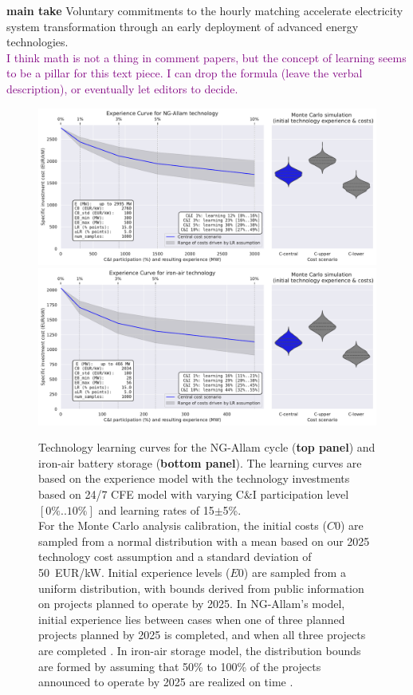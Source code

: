 \documentclass[pdflatex,sn-basic, Numbered]{sn-jnl}%
\theoremstyle{thmstyleone}%
\theoremstyle{thmstyletwo}%
\theoremstyle{thmstylethree}%
\newcommand{\comment}[1]{\textcolor{purple}{#1}}
\begin{document}
\noindent\textbf{main take} Voluntary commitments to the hourly matching accelerate electricity system transformation through an early deployment of advanced energy technologies. \\

\comment{I think math is not a thing in comment papers, but the concept of learning seems to be a pillar for this text piece. I can drop the formula (leave the verbal description), or eventually let editors to decide.}


\begin{figure}[htbp]
    \centering
    \includegraphics[width=\textwidth]{images/e_curve_NG-Allam.pdf}
    \includegraphics[width=\textwidth]{images/e_curve_iron-air.pdf}
    \caption{Technology learning curves for the NG-Allam cycle (\textbf{top panel}) and iron-air battery storage (\textbf{bottom panel}).
    The learning curves are based on the experience model with the technology investments based on 24/7 CFE model with varying C\&I participation level $[0\%..10\%]$ and learning rates of 15$\pm$5\%. \\
    For the Monte Carlo analysis calibration, the initial costs ($C0$) are sampled from a normal distribution with a mean based on our 2025 technology cost assumption and a standard deviation of 50~EUR/kW. Initial experience levels ($E0$) are sampled from a uniform distribution, with bounds derived from public information on projects planned to operate by 2025. In NG-Allam's model, initial experience lies between cases when one of three planned projects planned by 2025 is completed, and when all three projects are completed \cite{BroadwingEnergyProject, CoyoteCleanPower, FrogLakeProject}. In iron-air storage model, the distribution bounds are formed by assuming that 50\% to 100\% of the projects announced to operate by 2025 are realized on time \cite{FormEnergyLatest2024}.
    }
    \label{fig:panels}
\end{figure}
\end{document}
